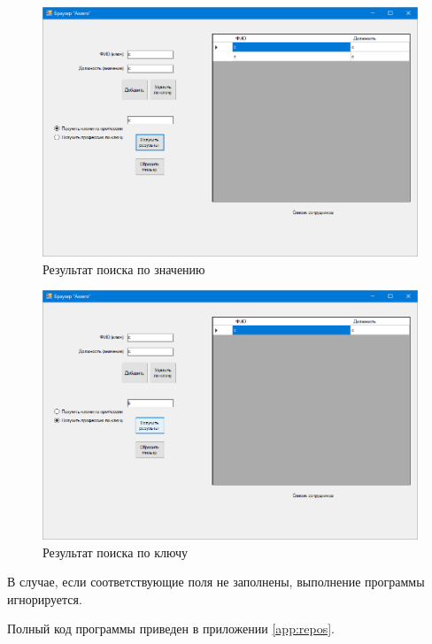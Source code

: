 \begin{figure}[H]
    \centering
    \includegraphics[scale=0.4]{task7/result4.png}
    \caption{Результат поиска по значению}
    \label{fig:result7}
\end{figure}
\begin{figure}[H]
    \centering
    \includegraphics[scale=0.4]{task7/result5.png}
    \caption{Результат поиска по ключу}
    \label{fig:result71}
\end{figure}
В случае, если соответствующие поля не заполнены, выполнение программы
игнорируется.

Полный код программы приведен в приложении \ref{app:repos}.

